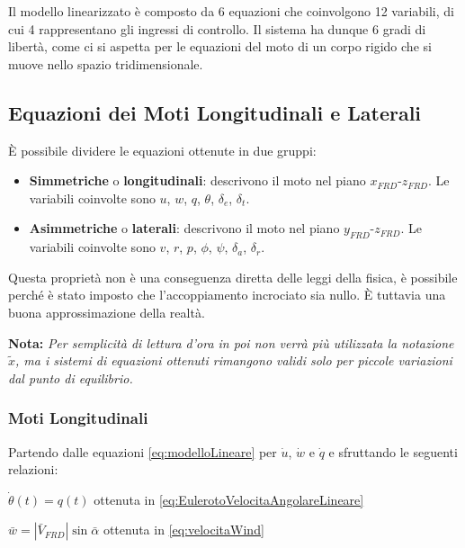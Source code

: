 Il modello linearizzato è composto da 6 equazioni che coinvolgono 12 variabili, di cui 4 rappresentano gli ingressi di controllo. Il sistema ha dunque 6 gradi di libertà, come ci si aspetta per le equazioni del moto di un corpo rigido che si muove nello spazio tridimensionale.

\subsection{Equazioni dei Moti Longitudinali e Laterali}
È possibile dividere le equazioni ottenute in due gruppi:
\begin{itemize}
    \item \textbf{Simmetriche} o \textbf{longitudinali}: descrivono il moto nel piano $x_{FRD}$-$z_{FRD}$. Le variabili coinvolte sono $u$, $w$, $q$, $\theta$, $\delta_e$, $\delta_t$.
    \item \textbf{Asimmetriche} o \textbf{laterali}: descrivono il moto nel piano $y_{FRD}$-$z_{FRD}$. Le variabili coinvolte sono $v$, $r$, $p$, $\phi$, $\psi$, $\delta_a$, $\delta_r$.
\end{itemize}

Questa proprietà non è una conseguenza diretta delle leggi della fisica, è possibile perché è stato imposto che l'accoppiamento incrociato sia nullo. È tuttavia una buona approssimazione della realtà.

\begin{note}
    \textbf{Nota:} \textit{Per semplicità di lettura d'ora in poi non verrà più utilizzata la notazione $\widetilde{x}$, ma i sistemi di equazioni ottenuti rimangono validi solo per piccole variazioni dal punto di equilibrio.}
\end{note}

\subsubsection{Moti Longitudinali}
Partendo dalle equazioni \eqref{eq:modelloLineare} per $\dot{u}$, $\dot{w}$ e $\dot{q}$ e sfruttando le seguenti relazioni:
\begin{sitemize}
    \item $\dot{\theta}(t) = q(t)$ ottenuta in \eqref{eq:EulerotoVelocitaAngolareLineare}
    \item $\bar{w} = |\bar{V}_{FRD}|\sin\bar{\alpha}$ ottenuta in \eqref{eq:velocitaWind}
\end{sitemize}

